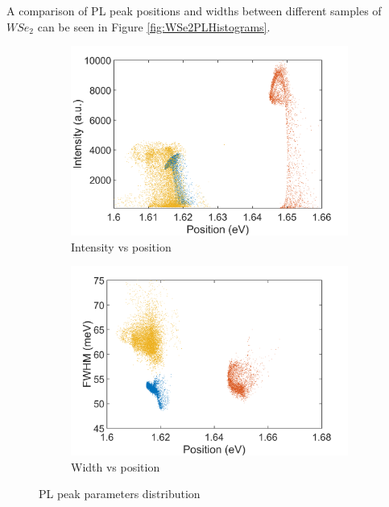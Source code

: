 A comparison of PL peak positions and widths between different samples of $WSe_2$ can be seen in Figure \ref{fig:WSe2PLHistograms}.

\begin{figure}[!h]
	\begin{center}
		\begin{subfigure}[b]{0.4\textwidth}
			\includegraphics[scale=0.2]{WSe2/WSe2PositionIntensityScatterComparison.png}
			\caption{Intensity vs position}
			\label{fig:WSe2PositionIntensityScatterComparison}
		\end{subfigure}
		\qquad
		\begin{subfigure}[b]{0.4\textwidth}
			\includegraphics[scale=0.2]{WSe2/Wse2PositionWidthScatterComparison.png}
			\caption{Width vs position}
			\label{fig:WSe2PositionWidthScatterComparison}
		\end{subfigure}
		\caption{PL peak parameters distribution}
		\label{fig:WSe2ScatterComparison}
	\end{center}
\end{figure}


